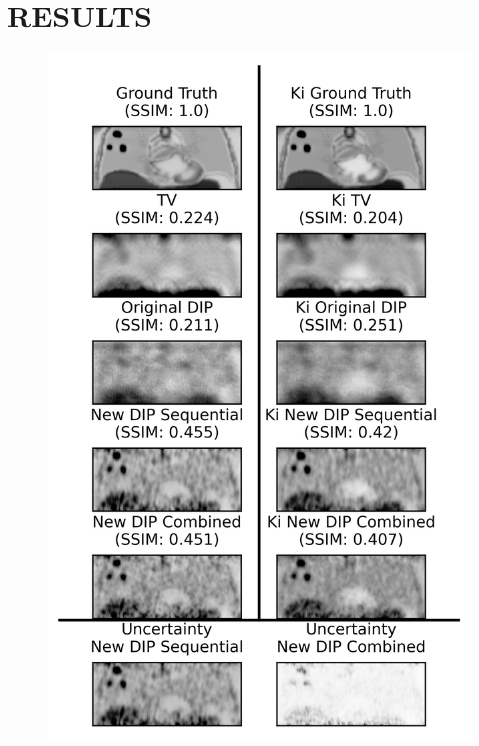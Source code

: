 \section{RESULTS} \label{sec:results}
    \begin{figure}
        
        \centering
    
        \includegraphics[width=1.0\linewidth]{figures/visual_analysis.png}
        
        

\end{figure}
